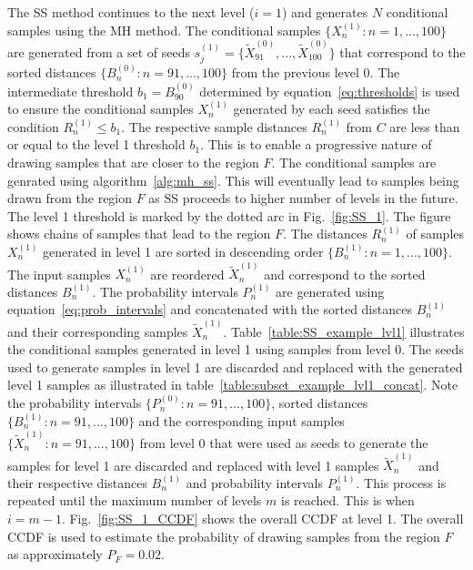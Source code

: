 \documentclass[journal]{IEEEtran}
\begin{document}
The SS method continues to the next level ($i = 1$) and generates $N$ conditional samples using the MH method. The conditional samples $\{X_{n}^{(1)}: n = 1,...,100\}$ are generated from a set of seeds $s_j^{(1)} = \{\tilde{X}_{91}^{(0)},...,\tilde{X}_{100}^{(0)}\}$ that correspond to the sorted distances $\{B_{n}^{(0)}: n = 91,...,100\}$ from the previous level 0. The intermediate threshold $b_{1} = B_{90}^{(0)}$ determined by equation~\ref{eq:thresholds} is used to ensure the conditional samples $X_{n}^{(1)}$ generated by each seed satisfies the condition $R_{n}^{(1)} \leq b_{1}$. The respective sample distances $R_{n}^{(1)}$ from $C$ are less than or equal to the level 1 threshold $b_{1}$. This is to enable a progressive nature of drawing samples that are closer to the region $F$. The conditional samples are genrated using algorithm~\ref{alg:mh_ss}. This will eventually lead to samples being drawn from the region $F$ as SS proceeds to higher number of levels in the future. The level 1 threshold is marked by the dotted arc in Fig.~\ref{fig:SS_1}. The figure shows chains of samples that lead to the region $F$. The distances $R_{n}^{(1)}$ of samples $X_{n}^{(1)}$ generated in level 1 are sorted in descending order $\{B_{n}^{(1)}: n = 1,...,100\}$. The input samples $X_{n}^{(1)}$ are reordered $\tilde{X}_{n}^{(1)}$ and correspond to the sorted distances $B_{n}^{(1)}$. The probability intervals $P_{n}^{(1)}$ are generated using equation~\ref{eq:prob_intervals} and concatenated with the sorted distances $B_{n}^{(1)}$ and their corresponding samples $\tilde{X}_{n}^{(1)}$. Table~\ref{table:SS_example_lvl1} illustrates the conditional samples generated in level 1 using samples from level 0. The seeds used to generate samples in level 1 are discarded and replaced with the generated level 1 samples as illustrated in table~\ref{table:subset_example_lvl1_concat}. Note the probability intervals $\{P_{n}^{(0)}: n = 91,...,100\}$, sorted distances $\{B_{n}^{(1)}: n = 91,...,100\}$ and the corresponding input samples $\{\tilde{X}_{n}^{(1)}: n = 91,...,100\}$ from level 0 that were used as seeds to generate the samples for level 1 are discarded and replaced with level 1 samples $\tilde{X}_{n}^{(1)}$ and their respective distances $B_{n}^{(1)}$ and probability intervals $P_{n}^{(1)}$. This process is repeated until the maximum number of levels $m$ is reached. This is when $i = m-1$. Fig.~\ref{fig:SS_1_CCDF} shows the overall CCDF at level 1. The overall CCDF is used to estimate the probability of drawing samples from the region $F$ as approximately $P_{F} = 0.02$.
\end{document}
